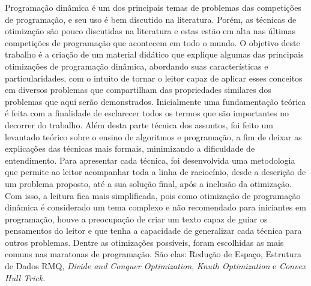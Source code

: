 \begin{resumo}
Programação dinâmica é um dos principais temas de problemas das competições de programação, e seu uso é bem discutido na literatura. Porém, as técnicas de otimização são pouco discutidas na literatura e estas estão em alta nas últimas competições de programação que acontecem em todo o mundo. O objetivo deste trabalho é a criação de um material didático que explique algumas das principais otimizações de programação dinâmica, abordando suas características e particularidades, com o intuito de tornar o leitor capaz de aplicar esses conceitos em diversos problemas que compartilham das propriedades similares dos problemas que aqui serão demonstrados. Inicialmente uma fundamentação teórica é feita com a finalidade de esclarecer todos os termos que são importantes no decorrer do trabalho. Além desta parte técnica dos assuntos, foi feito um levantado teórico sobre o ensino de algoritmos e programação, a fim de deixar as explicações das técnicas mais formais, minimizando a dificuldade de entendimento. Para apresentar cada técnica, foi desenvolvida uma metodologia que permite ao leitor acompanhar toda a linha de raciocínio, desde a descrição de um problema proposto, até a sua solução final, após a inclusão da otimização. Com isso, a leitura fica mais simplificada, pois como otimização de programação dinâmica é considerado um tema complexo e não recomendado para iniciantes em programação, houve a preocupação de criar um texto capaz de guiar os pensamentos do leitor e que tenha a capacidade de generalizar cada técnica para outros problemas. Dentre as otimizações possíveis, foram escolhidas as mais comuns nas maratonas de programação. São elas: Redução de Espaço, Estrutura de Dados RMQ, \textit{Divide and Conquer Optimization}, \textit{Knuth Optimization} e \textit{Convex Hull Trick}.
\end{resumo}	
